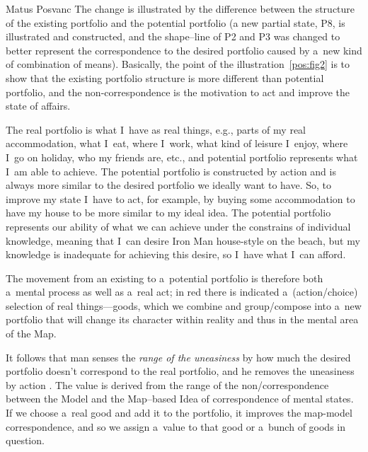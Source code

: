 \begin{artengenv}{Matus Posvanc}
The change is illustrated by the difference between the structure of the existing portfolio and the potential portfolio (a new partial state, P8, is illustrated and constructed, and the shape–line of P2 and P3 was changed to better represent the correspondence to the desired portfolio caused by a~new kind of combination of means). Basically, the point of the illustration~\ref{pos:fig2} is to show that the existing portfolio structure is more different than potential portfolio, and the non-correspondence is the motivation to act and improve the state of affairs.



The real portfolio is what I~have as real things, e.g., parts of my real accommodation, what I~eat, where I~work, what kind of leisure I~enjoy, where I~go on holiday, who my friends are, etc., and potential portfolio represents what I~am able to achieve. The potential portfolio is constructed by action and is always more similar to the desired portfolio we ideally want to have. So, to improve my state I~have to act, for example, by buying some accommodation to have my house to be more similar to my ideal idea. The potential portfolio represents our ability of what we can achieve under the constrains of individual knowledge, meaning that I~can desire Iron Man house-style on the beach, but my knowledge is inadequate for achieving this desire, so I~have what I~can afford.



The movement from an existing to a~potential portfolio is therefore both a~mental process as well as a~real act; in red there is indicated a~(action/choice) selection of real things---goods, which we combine and group/compose into a~new portfolio that will change its character within reality and thus in the mental area of the Map.



It follows that man senses the \textit{range of the uneasiness} by how much the desired portfolio doesn't correspond to the real portfolio, and he removes the uneasiness by action 
\parencite[compare to][sec.5.69 and 5.70]{Hayek1952Sensory}. %
 The value is derived from the range of the non/correspondence between the Model and the Map–based Idea of correspondence of mental states. If we choose a~real good and add it to the portfolio, it improves the map-model correspondence, and so we assign a~value to that good or a~bunch of goods in question.




\end{artengenv}
